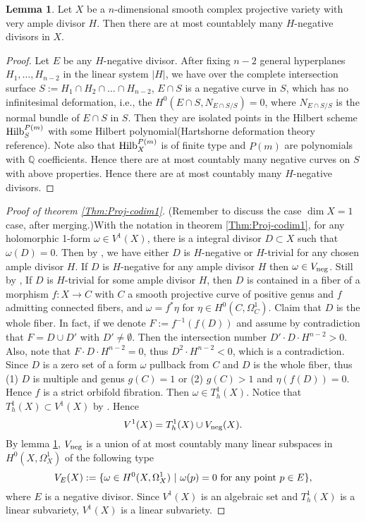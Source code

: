 \documentclass[a4paper,12pt,reqno]{amsart}
\theoremstyle{plain}
\theoremstyle{definition}
\newtheorem{lemma}[theorem]{Lemma}
\theoremstyle{remark}
\newcommand{\Q}{\mathbb Q}
\begin{document}
\begin{lemma} \label{countable} Let $X$ be a $n$-dimensional smooth complex projective variety with very ample divisor $H$. Then there are at most countablely many $H$-negative divisors in $X$.
\end{lemma}

\begin{proof}
Let $E$ be any $H$-negative divisor. After fixing $n-2$ general hyperplanes $H_1, \ldots, H_{n-2}$ in the linear system $|H|$, we have over the complete intersection surface $S:=H_1\cap H_2\cap\ldots\cap H_{n-2}$, $E\cap S$ is a negative curve in $S$, which has no infinitesimal deformation, i.e., the $H^0(E\cap S, N_{E\cap S/S})=0$, where $N_{E\cap S/S}$ is the normal bundle of $E\cap S$ in $S$. Then they are isolated points in the Hilbert scheme $\textnormal{Hilb}_S^{P(m)}$ with some Hilbert polynomial{\color{red}(Hartshorne deformation theory reference)}. Note also that $\textnormal{Hilb}_X^{P(m)}$ is of finite type and $P(m)$ are polynomials with $\Q$ coefficients. Hence there are at most countably many negative curves on $S$ with above properties. Hence there are at most countably many $H$-negative divisors.
\end{proof}

\begin{proof}[Proof  of theorem \ref{Thm:Proj-codim1}]
{\color{red}(Remember to discuss the case $\dim X=1$ case, after merging.)}With the notation in theorem \ref{Thm:Proj-codim1},  for any holomorphic 1-form $\omega\in V^1(X)$, there is a integral divisor $D\subset X$ such that $\omega(D)=0$. Then by \cite[theorem 2]{Sp88}, we have either $D$ is $H$-negative or $H$-trivial for any chosen ample divisor $H$. If $D$ is $H$-negative for any ample divisor $H$ then $\omega\in V_{\textnormal{neg}}$. Still by \cite[theorem 2]{Sp88}, If $D$ is $H$-trivial for some ample divisor $H$, then $D$ is contained in a fiber of a morphism $f: X\to C$ with $C$ a smooth projective curve of positive genus and $f$ admitting connected fibers, and $\omega=f^*\eta$ for $\eta\in H^0(C, \Omega_C^1)$. Claim that $D$ is the whole fiber. In fact, if we denote $F:=f^{-1}(f(D))$ and assume by contradiction that $F=D\cup D'$ with $D'\not=\emptyset$. Then the intersection number $D'\cdot D\cdot H^{n-2}>0$. Also, note that $F\cdot D\cdot H^{n-2}=0$, thus $D^2\cdot H^{n-2}<0$, which is a contradiction. Since $D$ is a zero set of a form $\omega$ pullback from $C$ and $D$ is the whole fiber, thus (1) $D$ is multiple and genus $g(C)=1$ or (2) $g(C)>1$ and $\eta(f(D))=0$. Hence $f$ is a strict orbifold fibration. Then $\omega\in T_h^1(X)$. Notice that $T_h^1(X)\subset V^1(X)$ by \cite{GL87}. Hence $$V^1(X)= T_h^1(X)\cup V_{\textnormal{neg}}(X).
$$
By lemma \ref{countable}, $V_{\textnormal{neg}}$ is a union of at most countably many linear subspaces in $H^0(X, \Omega_X^1)$ of the following type $$V_E(X):=\{\omega\in H^0(X, \Omega_X^1)\ |\ \omega(p)=0\  \textnormal{for any point}\ p\in E\},$$ where $E$ is a negative divisor. Since $V^1(X)$ is an algebraic set and $T_h^1(X)$ is a linear subvariety, $V^1(X)$ is a linear subvariety.
 \end{proof} 
 
\end{document}
